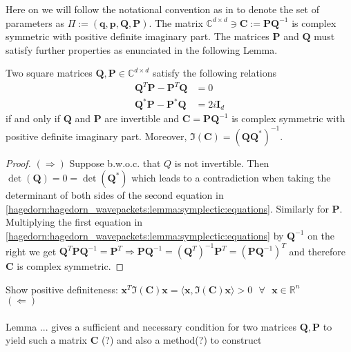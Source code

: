   Here on we will follow the notational convention
as in \cite{bourquinNumericalAlgorithmsSemiclassical2017} to denote the set 
of parameters as $\Pi := \left(\bm{q}, \bm{p}, \bm{Q}, \bm{P}\right)$. 
The matrix $\mathbb{C}^{d \times d} \ni \bm{C} := \bm{PQ}^{-1}$ is complex symmetric 
with positive definite imaginary part. The matrices $\bm{P}$ and $\bm{Q}$ must 
satisfy further properties as enunciated in the following Lemma. 
\begin{lemma}
  \label{hagedorn:hagedorn_orthogonal_projection:lemma:symplectic_equations} 
  Two square matrices $\bm{Q}, \bm{P} \in \mathbb{C}^{d \times d}$ satisfy the following relations 
  \begin{equation} 
    \begin{split}
      \bm{Q}^T\bm{P} - \bm{P}^T\bm{Q}   & = 0 \\
      \bm{Q}^*\bm{P} - \bm{P}^*\bm{Q} & = 2i\bm{I}_{d}
    \end{split}
    \label{hagedorn:hagedorn_wavepackets:lemma:symplectic:equations}
  \end{equation}
  if and only if $\bm{Q}$ and $\bm{P}$ are invertible and $\bm{C}=\bm{PQ}^{-1}$ is complex symmetric with positive 
  definite imaginary part. Moreover, $\Im(\bm{C}) = (\bm{QQ}^*)^{-1}$.
\end{lemma}
\begin{proof}
  $\left( \Rightarrow  \right)$ Suppose b.w.o.c. that $Q$ is 
  not invertible. Then $\det(\bm{Q}) = 0 = \det(\bm{Q}^*)$
  which leads to 
  a contradiction when taking the determinant of both sides of the 
  second equation in \eqref{hagedorn:hagedorn_wavepackets:lemma:symplectic:equations}.
  Similarly for $\bm{P}$.
  \\
  Multiplying the first equation in 
  \eqref{hagedorn:hagedorn_wavepackets:lemma:symplectic:equations}
  by $\bm{Q}^{-1}$ on the right we get $\bm{Q}^T\bm{PQ}^{-1} = \bm{P}^T \Rightarrow 
  \bm{PQ}^{-1} = (\bm{Q}^T)^{-1}\bm{P}^T = (\bm{PQ}^{-1})^T$ and therefore $\bm{C}$ is complex 
  symmetric.
\end{proof}
Show positive definiteness: $\bm{x}^T \Im(\bm{C}) \bm{x} = \langle \bm{x}, \Im(\bm{C})\bm{x}  \rangle > 0
\text{ } \forall \text{ } \bm{x} \in \mathbb{R}^n$
\\
$\left( \Leftarrow \right)$
\\\\
Lemma ... gives a sufficient and necessary condition for two matrices
$\bm{Q},\bm{P}$ to yield such a matrix $\bm{C}$ (?) and also a method(?) to construct 
